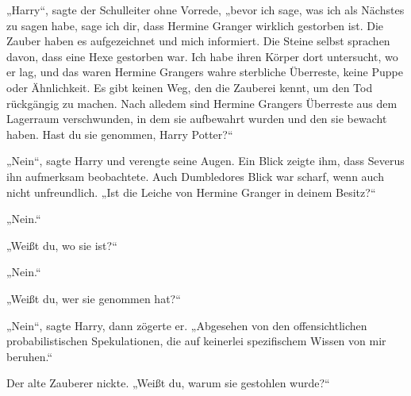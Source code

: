 „Harry“, sagte der Schulleiter ohne Vorrede, „bevor ich sage, was ich als Nächstes zu sagen habe, sage ich dir, dass Hermine Granger wirklich gestorben ist. Die Zauber haben es aufgezeichnet und mich informiert. Die Steine selbst sprachen davon, dass eine Hexe gestorben war. Ich habe ihren Körper dort untersucht, wo er lag, und das waren Hermine Grangers wahre sterbliche Überreste, keine Puppe oder Ähnlichkeit. Es gibt keinen Weg, den die Zauberei kennt, um den Tod rückgängig zu machen. Nach alledem sind Hermine Grangers Überreste aus dem Lagerraum verschwunden, in dem sie aufbewahrt wurden und den sie bewacht haben. Hast du sie genommen, Harry Potter?“


„Nein“, sagte Harry und verengte seine Augen.
Ein Blick zeigte ihm, dass Severus ihn aufmerksam beobachtete. Auch Dumbledores Blick war scharf, wenn auch nicht unfreundlich.
„Ist die Leiche von Hermine Granger in deinem Besitz?“

„Nein.“

„Weißt du, wo sie ist?“

„Nein.“

„Weißt du, wer sie genommen hat?“

„Nein“, sagte Harry, dann zögerte er.
„Abgesehen von den offensichtlichen probabilistischen Spekulationen, die auf keinerlei spezifischem Wissen von mir beruhen.“

Der alte Zauberer nickte.
„Weißt du, warum sie gestohlen wurde?“

